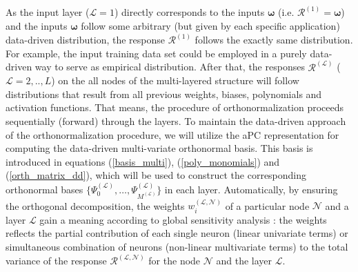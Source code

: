 \documentclass[a4paper,fleqn]{article}
\newcommand{\rw}[1]{\textcolor{blue}{#1}}
\newcommand{\del}[1]{\textcolor{red}{\sout{#1}}}
\renewcommand{\del}[1]{}
\renewcommand{\rw}[1]{#1}
\begin{document}
As the input layer ($\mathcal{L}=1$) directly corresponds to the inputs $\bm{\omega}$ (i.e. $\bm{\mathcal{R}}^{(1)}=\bm{\omega}$) and the inputs $\bm{\omega}$ follow some arbitrary (but given by each specific application) data-driven distribution, the response $\bm{\mathcal{R}}^{(1)}$ follows the exactly same distribution. For example, the input training data set could be employed in a purely data-driven way to serve as empirical distribution. After that, the responses $\bm{\mathcal{R}}^{(\mathcal{L})}$ ($\mathcal{L}=2,..,L$) on the all nodes of the multi-layered structure \rw{will} \del{could again} follow \del{any arbitrary data-driven} distributions that result from all previous weights, biases, polynomials and activation functions. That means, the procedure of orthonormalization proceeds sequentially (forward) through the layers. \del{To respect the data-driven structure of the orthonormalization procedure, we will employ the aPC representation to compute the data-driven multi-variate orthonormal basis introduced in equations (\ref{basis_multi}), (\ref{poly_monomials}) and (\ref{orth_matrix_dd}) to construct the corresponding orthonormal bases $\big\{ \Psi^{(\mathcal{L})}_0,\ldots, \Psi^{(\mathcal{L})}_{M^{(\mathcal{L})}}\big\}$ in each layer.}
\rw{To maintain the data-driven approach of the orthonormalization procedure, we will utilize the aPC representation for computing the data-driven multi-variate orthonormal basis. This basis is introduced in equations (\ref{basis_multi}), (\ref{poly_monomials}) and (\ref{orth_matrix_dd}), which will be used to construct the corresponding orthonormal bases $\big\{ \Psi^{(\mathcal{L})}_0,\ldots, \Psi^{(\mathcal{L})}_{M^{(\mathcal{L})}}\big\}$ in each layer.}
Automatically, by ensuring the orthogonal decomposition, the weights $w^{(\mathcal{L},\mathcal{N})}_{i}$ of a particular node $\mathcal{N}$ and a layer $\mathcal{L}$ gain a meaning according to  global sensitivity analysis \cite{oladyshkin2012global}: the weights reflects the partial contribution of each single neuron (linear \rw{univariate} terms) or simultaneous combination of neurons (non-linear \rw{multivariate} terms) to the total variance of the response $\mathcal{R}^{(\mathcal{L},\mathcal{N})}$ for the node $\mathcal{N}$ and the layer $\mathcal{L}$.
\end{document}
